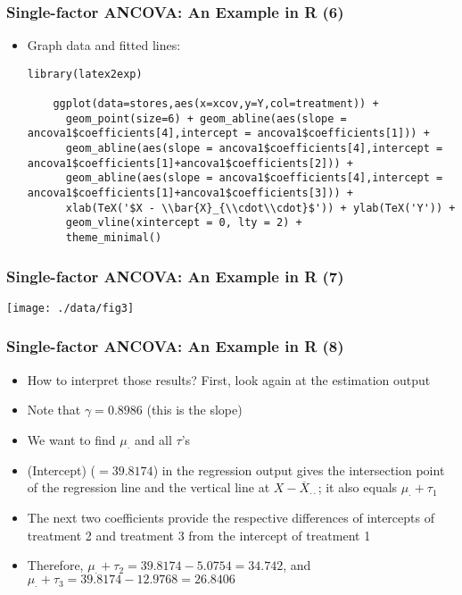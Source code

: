 \documentclass[10pt]{beamer}
\theoremstyle{definition}
\begin{document}
\begin{frame}[fragile]
\frametitle{Single-factor ANCOVA: An Example in R (6)}
\begin{itemize}
	\item Graph data and fitted lines:
	\begin{lstlisting}[style = rstyle, breaklines] 
	library(latex2exp)

	ggplot(data=stores,aes(x=xcov,y=Y,col=treatment)) + 
	  geom_point(size=6) + geom_abline(aes(slope = ancova1$coefficients[4],intercept = ancova1$coefficients[1])) + 
	  geom_abline(aes(slope = ancova1$coefficients[4],intercept = ancova1$coefficients[1]+ancova1$coefficients[2])) + 
	  geom_abline(aes(slope = ancova1$coefficients[4],intercept = ancova1$coefficients[1]+ancova1$coefficients[3])) +
	  xlab(TeX('$X - \\bar{X}_{\\cdot\\cdot}$')) + ylab(TeX('Y')) + 
	  geom_vline(xintercept = 0, lty = 2) + 
	  theme_minimal()
	\end{lstlisting}
\end{itemize}
\end{frame}

\begin{frame}[fragile]
\frametitle{Single-factor ANCOVA: An Example in R (7)}
\centerline{\texttt{[image: ./data/fig3]}}
\end{frame}

\begin{frame}[fragile]
\frametitle{Single-factor ANCOVA: An Example in R (8)}
\begin{itemize}
	\item How to interpret those results? First, look again at the estimation output
	\item Note that $\gamma = 0.8986$ (this is the slope)
	\item We want to find $\mu_{\cdot}$ and all $\tau$'s
	\item (Intercept) ($=39.8174$) in the regression output gives the intersection point of the regression line and the vertical line at $X - \overline{X}_{\cdot\cdot}$; it also equals $\mu_{\cdot} + \tau_{1}$
	\item The next two coefficients provide the respective differences of intercepts of treatment 2 and treatment 3 from the intercept of treatment 1
	\item Therefore, $\mu_{\cdot} + \tau_{2} = 39.8174 - 5.0754 = 34.742$, and $\mu_{\cdot} + \tau_{3} = 39.8174 - 12.9768 = 26.8406$
\end{itemize}
\end{frame}
\end{document}
